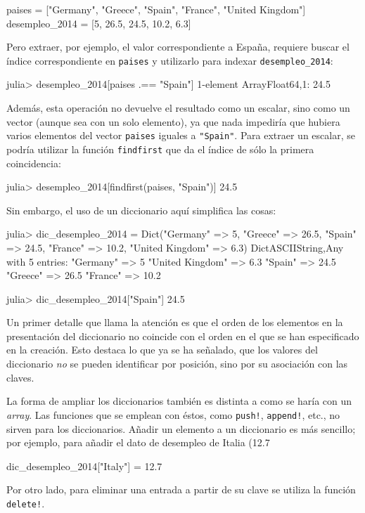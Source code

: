 ﻿\documentclass{article}
\newcommand{\code}{\texttt}
\begin{document}
paises = ["Germany", "Greece", "Spain", "France", "United Kingdom"]
desempleo_2014 = [5, 26.5, 24.5, 10.2, 6.3]

Pero extraer, por ejemplo, el valor correspondiente a España, requiere buscar el índice correspondiente en \code{paises} y utilizarlo para indexar \code{desempleo_2014}:

julia> desempleo_2014[paises .== "Spain"]
1-element Array{Float64,1}:
 24.5

Además, esta operación no devuelve el resultado como un escalar, sino como un vector (aunque sea con un solo elemento), ya que nada impediría que hubiera varios elementos del vector \code{paises} iguales a \code{"Spain"}. Para extraer un escalar, se podría utilizar la función \code{findfirst} que da el índice de sólo la primera coincidencia:

julia> desempleo_2014[findfirst(paises, "Spain")]
24.5

Sin embargo, el uso de un diccionario aquí simplifica las cosas:

julia> dic_desempleo_2014 = Dict("Germany" => 5,
                       "Greece" => 26.5,
                       "Spain" => 24.5,
                       "France" => 10.2,
                       "United Kingdom" => 6.3)
Dict{ASCIIString,Any} with 5 entries:
  "Germany"        => 5
  "United Kingdom" => 6.3
  "Spain"          => 24.5
  "Greece"         => 26.5
  "France"         => 10.2

julia> dic_desempleo_2014["Spain"]
24.5

Un primer detalle que llama la atención es que el orden de los elementos en la presentación del diccionario no coincide con el orden en el que se han especificado en la creación. Esto destaca lo que ya se ha señalado, que los valores del diccionario \emph{no} se pueden identificar por posición, sino por su asociación con las claves.

La forma de ampliar los diccionarios también es distinta a como se haría con un \emph{array}. Las funciones que se emplean con éstos, como \code{push!}, \code{append!}, etc., no sirven para los diccionarios. Añadir un elemento a un diccionario es más sencillo; por ejemplo, para añadir el dato de desempleo de Italia (12.7%

dic_desempleo_2014["Italy"] = 12.7

Por otro lado, para eliminar una entrada a partir de su clave se utiliza la función \code{delete!}. 
\end{document}

